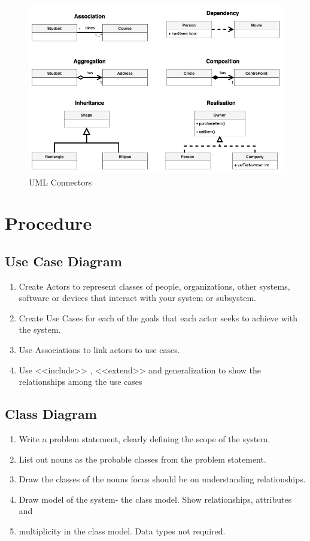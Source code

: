 \documentclass[11pt]{article}
\begin{document}
\begin{figure}[H]
	\centering
	\includegraphics[scale=0.6]{uml-connectors.png}
	\caption{UML Connectors}
\end{figure}

\section{Procedure}

\subsection{Use Case Diagram}
\begin{enumerate}
	\item Create Actors to represent classes of people, organizations, other systems, software or
	      devices that interact with your system or subsystem.
	\item Create Use Cases for each of the goals that each actor seeks to achieve with the
	      system.
	\item Use Associations to link actors to use cases.
	\item Use <<include>> , <<extend>> and generalization to show the relationships among
	      the use cases
\end{enumerate}

\subsection{Class Diagram}
\begin{enumerate}
	\item Write a problem statement, clearly defining the scope of the system.
	\item List out nouns as the probable classes from the problem statement.
	\item Draw the classes of the nouns focus should be on understanding relationships.
	\item Draw model of the system- the class model. Show relationships, attributes and
	\item multiplicity in the class model. Data types not required.
\end{enumerate}
\end{document}
